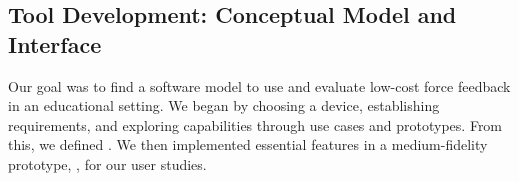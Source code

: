 \subsection{Tool Development: Conceptual Model and Interface}
Our goal was to find a software model to use and evaluate low-cost force feedback in an educational setting.
We began by choosing a device, establishing requirements, and exploring capabilities through use cases and prototypes.
From this, we defined %
\HandsOn.
We then implemented  essential features in a medium-fidelity prototype, \SpringSim, for our user studies.





